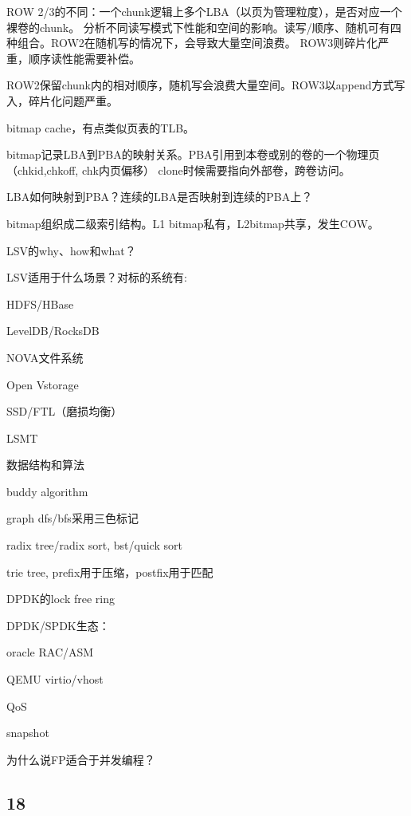 ROW 2/3的不同：一个chunk逻辑上多个LBA（以页为管理粒度），是否对应一个裸卷的chunk。
分析不同读写模式下性能和空间的影响。读写/顺序、随机可有四种组合。ROW2在随机写的情况下，会导致大量空间浪费。
ROW3则碎片化严重，顺序读性能需要补偿。

ROW2保留chunk内的相对顺序，随机写会浪费大量空间。ROW3以append方式写入，碎片化问题严重。

bitmap cache，有点类似页表的TLB。

bitmap记录LBA到PBA的映射关系。PBA引用到本卷或别的卷的一个物理页（chkid,chkoff, chk内页偏移）
clone时候需要指向外部卷，跨卷访问。

LBA如何映射到PBA？连续的LBA是否映射到连续的PBA上？

bitmap组织成二级索引结构。L1 bitmap私有，L2bitmap共享，发生COW。

\hrulefill

LSV的why、how和what？

LSV适用于什么场景？对标的系统有:
\begin{enumbox}
\item HDFS/HBase
\item LevelDB/RocksDB
\item NOVA文件系统
\item Open Vstorage
\item SSD/FTL（磨损均衡）
\item LSMT
\end{enumbox}

\hrulefill

数据结构和算法
\begin{enumbox}
\item buddy algorithm
\item graph dfs/bfs采用三色标记
\item radix tree/radix sort, bst/quick sort
\item trie tree, prefix用于压缩，postfix用于匹配
\item DPDK的lock free ring
\item DPDK/SPDK生态：
    \begin{enumbox}
    \item oracle RAC/ASM
    \item QEMU virtio/vhost
    \end{enumbox}
\item QoS
\item snapshot
\end{enumbox}

为什么说FP适合于并发编程？

\subsection{18}

